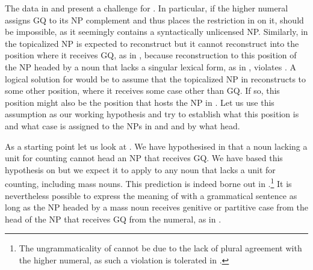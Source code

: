 \documentclass[output=paper,
modfonts,
newtxmath,
hidelinks
]{langscibook}
\begin{document}
\ea \label{ex10}
	\z
\z

\noindent The data in  and  present a challenge for . In particular, if the higher numeral assigns GQ to its NP complement and thus places the restriction in  on it,  should be impossible, as it seemingly contains a syntactically unlicensed NP. Similarly, in  the topicalized NP is expected to reconstruct but it cannot reconstruct into the position where it receives GQ, as in , because reconstruction to this position of the NP headed by a noun that lacks a singular lexical form, as in , violates . A logical solution for  would be to assume that the topicalized NP in  reconstructs to some other position, where it receives some case other than GQ. If so, this position might also be the position that hosts the NP in . Let us use this assumption as our working hypothesis and try to establish what this position is and what case is assigned to the NPs in  and  and by what head. 

As a starting point let us look at . We have hypothesised in  that a noun lacking a unit for counting cannot head an NP that receives GQ. We have based this hypothesis on  but we expect it to apply to any noun that lacks a unit for counting, including mass nouns. This prediction is indeed borne out in .\footnote{\label{fn9}The ungrammaticality of  cannot be due to the lack of plural agreement with the higher numeral, as such a violation is tolerated in .} 
It is nevertheless possible to express the meaning of  with a grammatical sentence as long as the NP headed by a mass noun receives genitive or partitive case from the head of the NP that receives GQ from the numeral, as in .
\end{document}
